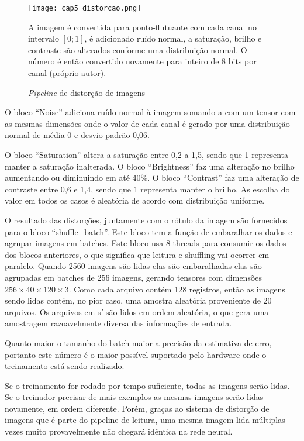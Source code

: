 \begin{figure}[!htb]
	\centering
	\texttt{[image: cap5\_distorcao.png]}
	\caption{\emph{Pipeline} de distorção de imagens}
	\label{fig:cap5_distorcao}
	A imagem é convertida para ponto-flutuante com cada canal no intervalo
	$[0;1]$, é adicionado ruído normal, a saturação, brilho e contraste são
	alterados conforme uma distribuição normal. O número é então convertido
	novamente para inteiro de 8 bits por canal (próprio autor).
\end{figure}

O bloco “Noise” adiciona ruído normal à imagem somando-a com um tensor com as
mesmas dimensões onde o valor de cada canal é gerado por uma distribuição
normal de média 0 e desvio padrão 0,06.

O bloco “Saturation” altera a saturação entre 0,2 a 1,5, sendo que 1 representa
manter a saturação inalterada. O bloco “Brightness” faz uma alteração no brilho
aumentando ou diminuindo em até 40\%. O bloco “Contrast” faz uma alteração de
contraste entre 0,6 e 1,4, sendo que 1 representa manter o brilho. As escolha
do valor em todos os casos é aleatória de acordo com distribuição uniforme.

O resultado das distorções, juntamente com o rótulo da imagem são fornecidos
para o bloco “shuffle\_batch”. Este bloco tem a função de embaralhar os
dados e agrupar imagens em batches. Este bloco usa 8 threads para consumir
os dados dos blocos anteriores, o que significa que leitura e shuffling vai
ocorrer em paralelo. Quando 2560 imagens são lidas elas são embaralhadas
elas são agrupadas em batches de 256 imagens, gerando tensores com
dimensões $256 \times 40 \times 120 \times 3$. Como cada arquivo contém
128 registros, então as imagens
sendo lidas contém, no pior caso, uma amostra aleatória proveniente de 20
arquivos. Os arquivos em sí são lidos em ordem aleatória, o que gera uma
amostragem razoavelmente diversa das informações de entrada.

Quanto maior o tamanho do batch maior a precisão da estimativa de erro,
portanto este número é o maior possível suportado pelo hardware onde o
treinamento está sendo realizado.

Se o treinamento for rodado por tempo suficiente, todas as imagens serão
lidas. Se o treinador precisar de mais exemplos as mesmas imagens serão lidas
novamente, em ordem diferente. Porém, graças ao sistema de distorção de
imagens que é parte do pipeline de leitura, uma mesma imagem lida múltiplas
vezes muito provavelmente não chegará idêntica na rede neural.

